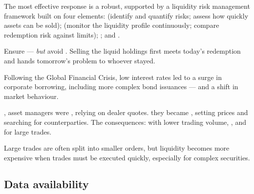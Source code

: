 The most effective response is a robust, 
supported by a liquidity risk management framework built on four elements:
 (identify and quantify risks; assess how quickly
assets can be sold);  (monitor the liquidity
profile continuously; compare redemption risk against limits); ; and .

\begin{imkeybox}[title={The core objective has two sides}]
Ensure  --- \emph{but} avoid
. Selling the liquid
holdings first meets today's redemption and hands tomorrow's problem to whoever
stayed.
\end{imkeybox}


Following the Global Financial Crisis, low interest rates led to a surge in
corporate borrowing, including more complex bond issuances --- and a shift in
market behaviour.

\begin{imkeybox}[title={Price takers to price makers}]
, asset managers were , relying on
dealer quotes.  they became , setting
prices and searching for counterparties. The consequences: 
with lower trading volume, , and  for large trades.
\end{imkeybox}

Large trades are often split into smaller orders, but liquidity becomes more
expensive when trades must be executed quickly, especially for complex securities.

\subsection{Data availability}

